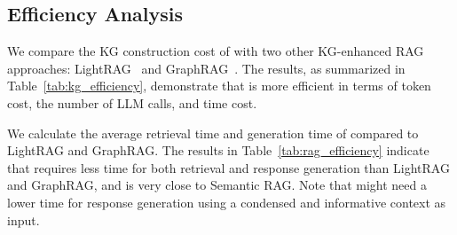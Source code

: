 \begin{table}[!ht]
\centering
{}
\caption{Comparison results on TriviaQA.}
\label{tab:results_trivia}
\end{table}

\subsection{Efficiency Analysis}
\label{app:efficiency_analysis}
We compare the KG construction cost of \modelname with two other KG-enhanced RAG approaches: LightRAG~\cite{guo2024lightrag} and GraphRAG~\cite{darren24graphrag}. The results, as summarized in Table~\ref{tab:kg_efficiency}, demonstrate that \modelname is more efficient in terms of token cost, the number of LLM calls, and time cost.

\begin{table}[!ht]
\centering
{}
\caption{Comparison of average LLM and time cost per chunk during KG construction.}
\label{tab:kg_efficiency}
\end{table}

We calculate the average retrieval time and generation time of \modelname compared to LightRAG and GraphRAG. The results in Table~\ref{tab:rag_efficiency} indicate that \modelname requires less time for both retrieval and response generation than LightRAG and GraphRAG, and is very close to Semantic RAG. Note that \modelname might need a lower time for response generation using a condensed and informative context as input.

